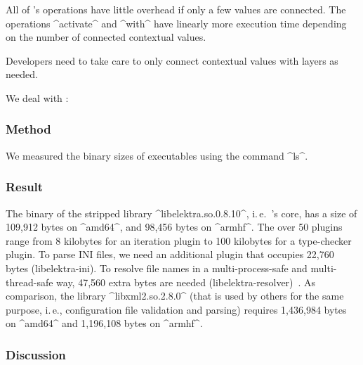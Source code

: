 \begin{finding}
All of \elektra{}'s operations have little overhead if only a few values are connected.
The operations ^activate^ and ^with^ have linearly more execution time depending on the number of connected contextual values.

\begin{implication}
Developers need to take care to only connect contextual values with layers as needed.
\end{implication}
\end{finding}









\label{sec:resource-utilization}

We deal with :
\rqEvaluationFrontendRessourceUtilization*

\subsubsection{Method}

We measured the binary sizes of executables using the command ^ls^.

\subsubsection{Result}

The binary of the stripped library ^libelektra.so.0.8.10^, i.\,e.\ 's core, has a size of 109,912 bytes on ^amd64^, and 98,456 bytes on ^armhf^.
The over 50 plugins range from 8 kilobytes for an iteration plugin to 100 kilobytes for a type-checker plugin.
To parse INI files, we need an additional plugin that occupies 22,760 bytes (libelektra-ini).
To resolve file names in a multi-process-safe and multi-thread-safe way, 47,560 extra bytes are needed (libelektra-resolver)~\cite{raab2015global}.
As comparison, the library ^libxml2.so.2.8.0^ (that is used by others for the same purpose, i.\,e., configuration file validation and parsing) requires 1,436,984 bytes on ^amd64^ and 1,196,108 bytes on ^armhf^.


\subsubsection{Discussion}

